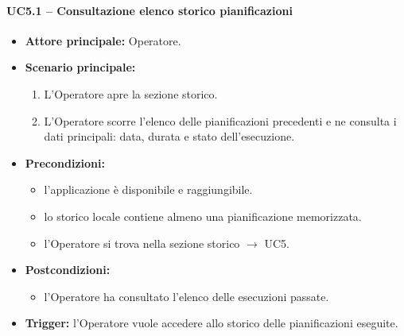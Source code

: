 \paragraph{UC5.1 -- Consultazione elenco storico pianificazioni}
\begin{itemize}
    \item \textbf{Attore principale:} Operatore.
    \item \textbf{Scenario principale:}
    \begin{enumerate}
        \item L'Operatore apre la sezione storico.
        \item L'Operatore scorre l'elenco delle pianificazioni precedenti e ne consulta i dati principali: data, durata e stato dell'esecuzione.
    \end{enumerate}
    \item \textbf{Precondizioni:}
    \begin{itemize}
        \item l'applicazione è disponibile e raggiungibile.
        \item lo storico locale contiene almeno una pianificazione memorizzata.
        \item l'Operatore si trova nella sezione storico $\rightarrow$ UC5.
    \end{itemize}
    \item \textbf{Postcondizioni:}
    \begin{itemize}
        \item l'Operatore ha consultato l'elenco delle esecuzioni passate.
    \end{itemize}
    \item \textbf{Trigger:} l'Operatore vuole accedere allo storico delle pianificazioni eseguite.
\end{itemize}


